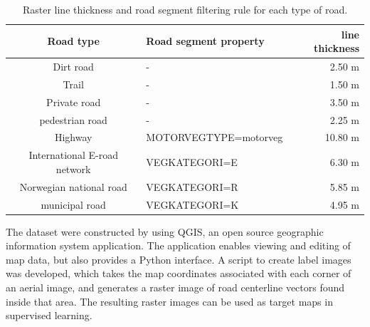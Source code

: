 

\begin{table}[htp]
\caption{Raster line thickness and road segment filtering rule for each type of road. }
\begin{center}
\begin{adjustbox}{max width=\textwidth}
\begin{tabular}{|c|l|r|}\hline
 		 Road type & Road segment property & line thickness\\\hline
 		 Dirt road & - & 2.50 m\\\hline
 		 Trail & - & 1.50 m\\\hline
 		 Private road & - & 3.50 m\\\hline
 		 pedestrian road & - & 2.25 m\\\hline
 		 Highway & MOTORVEGTYPE=motorveg & 10.80 m\\\hline
 		 International E-road network & VEGKATEGORI=E & 6.30 m\\\hline
 		 Norwegian national road & VEGKATEGORI=R & 5.85 m\\\hline
 		 municipal road & VEGKATEGORI=K & 4.95 m\\\hline
\end{tabular}
\end{adjustbox}
\end{center}
\label{tab:road_rules}
\end{table}

The dataset were constructed by using QGIS, an open source geographic information system application. The application enables viewing and editing of map data, but also provides a Python interface. A script to create label images was developed, which takes the map coordinates associated with each corner of an aerial image, and generates a raster image of road centerline vectors found inside that area. The resulting raster images can be used as target maps in supervised learning. \\

